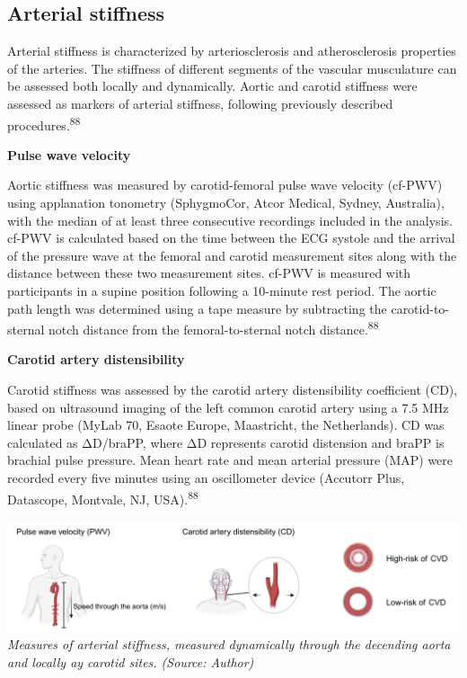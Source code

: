 \documentclass[
  letterpaper,
  headsepline=true,
  open=any]{scrbook}
\begin{document}
\hypertarget{arterial-stiffness}{%
\subsection{Arterial stiffness}\label{arterial-stiffness}}

Arterial stiffness is characterized by arteriosclerosis and
atherosclerosis properties of the arteries. The stiffness of different
segments of the vascular musculature can be assessed both locally and
dynamically. Aortic and carotid stiffness were assessed as markers of
arterial stiffness, following previously described
procedures.\textsuperscript{88}

\textbf{Pulse wave velocity}

Aortic stiffness was measured by carotid-femoral pulse wave velocity
(cf-PWV) using applanation tonometry (SphygmoCor, Atcor Medical, Sydney,
Australia), with the median of at least three consecutive recordings
included in the analysis. cf-PWV is calculated based on the time between
the ECG systole and the arrival of the pressure wave at the femoral and
carotid measurement sites along with the distance between these two
measurement sites. cf-PWV is measured with participants in a supine
position following a 10-minute rest period. The aortic path length was
determined using a tape measure by subtracting the carotid-to-sternal
notch distance from the femoral-to-sternal notch
distance.\textsuperscript{88}

\textbf{Carotid artery distensibility}

Carotid stiffness was assessed by the carotid artery distensibility
coefficient (CD), based on ultrasound imaging of the left common carotid
artery using a 7.5 MHz linear probe (MyLab 70, Esaote Europe,
Maastricht, the Netherlands). CD was calculated as ΔD/braPP, where ΔD
represents carotid distension and braPP is brachial pulse pressure. Mean
heart rate and mean arterial pressure (MAP) were recorded every five
minutes using an oscillometer device (Accutorr Plus, Datascope,
Montvale, NJ, USA).\textsuperscript{88}

\includegraphics{images/Methods_arterial_stiffness.pdf} \emph{Measures
of arterial stiffness, measured dynamically through the decending aorta
and locally ay carotid sites. (Source: Author)}
\end{document}
